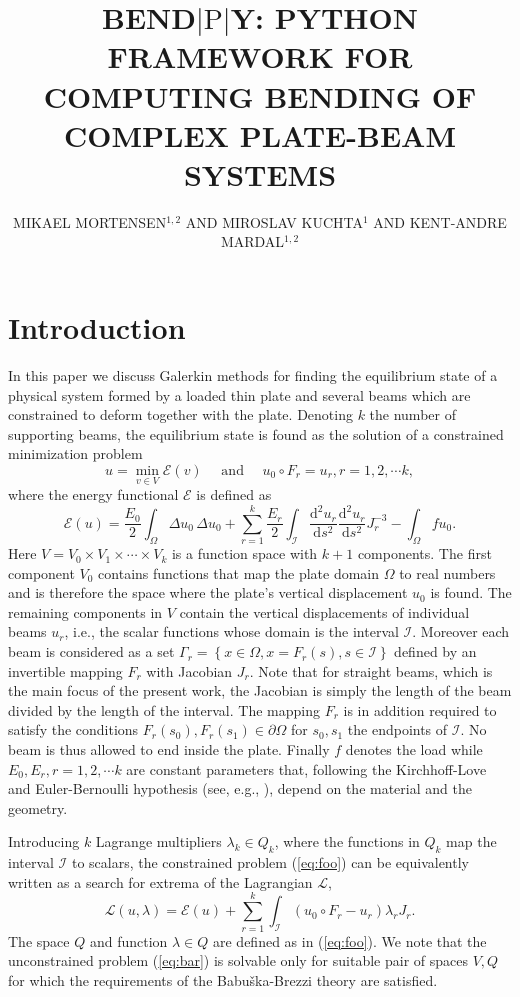 \documentclass{marine_2015}
\title{
  BEND$\left|\text{P}\right|$Y: PYTHON FRAMEWORK FOR COMPUTING BENDING OF COMPLEX PLATE-BEAM SYSTEMS
}
\author{MIKAEL MORTENSEN$^{1, 2}$ AND MIROSLAV KUCHTA$^{1}$ AND KENT-ANDRE MARDAL$^{1, 2}$ }
\newcommand{\deriv}[2]{\ensuremath{\frac{\mathrm{d}#1}{\mathrm{d}#2}}}
\begin{document}
\section{Introduction}
In this paper we discuss Galerkin methods for finding the equilibrium state of a 
physical system formed by a loaded thin plate and several beams which are constrained 
to deform together with the plate. Denoting $k$ the number of supporting beams, 
the equilibrium state is found as the solution of a constrained minimization problem
\begin{equation}
  \label{eq:foo}
  u = \min_{v\in V} \mathcal{E}\left(v\right)\quad\text{ and }\quad u_0\circ F_r
  = u_r, r=1, 2, \cdots k,
\end{equation}
where the energy functional $\mathcal{E}$ is defined as
\[
  \mathcal{E}\left(u\right)=
    \frac{E_0}{2}\displaystyle\int_{\Omega}\Delta u_0\,\Delta u_0+
    \sum_{r=1}^k\frac{E_r}{2}\int_{\mathcal{I}}
  \deriv{^2u_r}{s^2}\deriv{^2u_r}{s^2}J_r^{-3}
  -\displaystyle\int_{\Omega}f u_0.
\]
Here $V=V_0\times V_1 \times\cdots\times V_k$ is a function space with $k+1$
components. The first component $V_0$ contains functions that map the plate
domain $\Omega$ to real numbers and is therefore the space where the plate's
vertical displacement $u_0$ is found. The remaining components in $V$ contain the 
vertical displacements of individual beams $u_r$, i.e., the scalar 
functions whose domain is the interval $\mathcal{I}$. Moreover each beam is
considered as a set $\Gamma_r=\left\{x\in\Omega, x=F_r\left(s\right), s\in\mathcal{I}\right\}$
defined by an invertible mapping $F_r$ with Jacobian $J_r$. Note that for straight 
beams, which is the main focus of the present work, the Jacobian is simply the length of
the beam divided by the length of the interval. The mapping $F_r$ is in addition 
required to satisfy the conditions $F_r\left(s_0\right), F_r\left(s_1\right)\in\partial\Omega$ 
for $s_0, s_1$ the endpoints of $\mathcal{I}$. No beam is thus allowed to end inside 
the plate. Finally $f$ denotes the load while $E_0, E_r, r=1,2,\cdots k$ are 
constant parameters that, following the Kirchhoff-Love and Euler-Bernoulli
hypothesis (see, e.g., \cite{reddy}), depend on the material and the geometry.

Introducing $k$ Lagrange multipliers $\lambda_k\in Q_k$, where the functions in 
$Q_k$ map the interval $\mathcal{I}$ to scalars, the constrained problem 
(\ref{eq:foo}) can be equivalently written as a search for extrema of the Lagrangian
$\mathcal{L}$,
\begin{equation}
  \label{eq:bar}
\mathcal{L}\left(u, \lambda\right) = \mathcal{E}\left(u\right) +
  \sum_{r=1}^k\int_{\mathcal{I}}\left(u_0\circ F_r - u_r\right)\lambda_r J_r.
\end{equation}
The space $Q$ and function $\lambda\in Q$ are defined as in (\ref{eq:foo}).
We note that the unconstrained problem (\ref{eq:bar}) is solvable only for
suitable pair of spaces $V, Q$ for which the requirements of the
Babu\v{s}ka-Brezzi\cite{babuska, brezzi} theory are satisfied.
\end{document}
